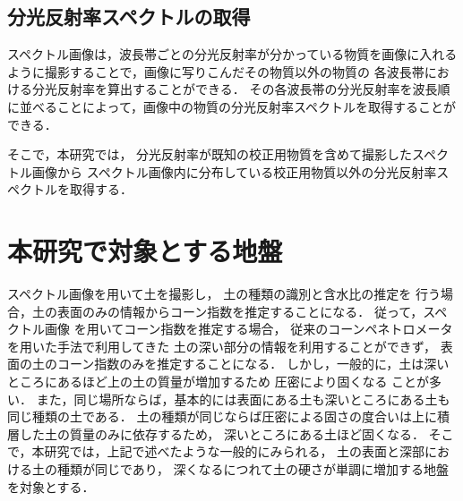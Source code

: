 \clearpage

\subsection{分光反射率スペクトルの取得}
\label{ssec:SpectrumGet}

スペクトル画像は，波長帯ごとの分光反射率が分かっている物質を画像に入れるように撮影することで，画像に写りこんだその物質以外の物質の
各波長帯における分光反射率を算出することができる．
その各波長帯の分光反射率を波長順に並べることによって，画像中の物質の分光反射率スペクトルを取得することができる．%

そこで，本研究では，
分光反射率が既知の校正用物質を含めて撮影したスペクトル画像から
スペクトル画像内に分布している校正用物質以外の分光反射率スペクトルを取得する．


\clearpage

\section{本研究で対象とする地盤}
\label{sec:Ground}

スペクトル画像を用いて土を撮影し，
土の種類の識別と含水比の推定を
行う場合，土の表面のみの情報からコーン指数を推定することになる．
従って，スペクトル画像
を用いてコーン指数を推定する場合，
従来のコーンペネトロメータを用いた手法で利用してきた
土の深い部分の情報を利用することができず，
表面の土のコーン指数のみを推定することになる．
しかし，一般的に，土は深いところにあるほど上の土の質量が増加するため
圧密により固くなる
ことが多い\cite{森本1975}\cite{高田1983}．
また，同じ場所ならば，基本的には表面にある土も深いところにある土も同じ種類の土である．%
土の種類が同じならば圧密による固さの度合いは上に積層した土の質量のみに依存するため，
深いところにある土ほど固くなる．
そこで，本研究では，上記で述べたような一般的にみられる，
土の表面と深部における土の種類が同じであり，
深くなるにつれて土の硬さが単調に増加する地盤を対象とする．


